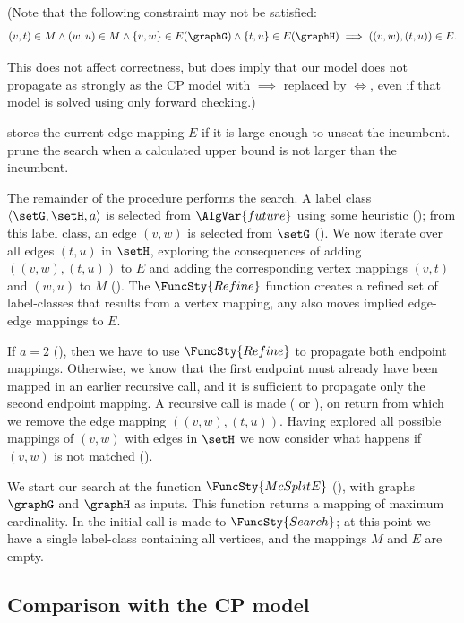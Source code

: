 (Note that the following constraint may not be satisfied:
\[
(v,t) \in M \wedge (w,u) \in M \wedge \{v,w\} \in E(\graphG) \wedge \{t,u\} \in E(\graphH) \implies ((v,w),(t,u)) \in E.
\]

This does not affect correctness, but does imply that our model does not propagate as strongly as
the CP model with $\implies$ replaced by $\Longleftrightarrow$,
even if that model is solved using only forward checking.)

 stores the current edge mapping $E$ if it is large enough
to unseat the incumbent.   prune the
search when a calculated upper bound is not larger than the incumbent.

The remainder of the procedure performs the search.  A label class $\langle
\setG, \setH, a \rangle$ is selected from $\AlgVar{future}$ using some
heuristic (); from this label class, an edge $(v,w)$ is
selected from $\setG$ (). We now iterate over all edges
$(t,u)$ in $\setH$, exploring the consequences of adding $((v,w),(t,u))$ to $E$
and adding the corresponding vertex mappings $(v,t)$ and $(w,u)$ to $M$
().  The $\FuncSty{Refine}$ function
creates a refined set of label-classes that results from a vertex mapping,
any also moves implied edge-edge mappings to $E$.

If $a=2$ (), then we have to use $\FuncSty{Refine}$ to propagate
both endpoint mappings.  Otherwise, we know that the first endpoint must already have
been mapped in an earlier recursive call, and it is sufficient to propagate only the second
endpoint mapping.  
A recursive call is made ( or ),
on return from which we remove the edge mapping $((v,w),(t,u))$.
Having explored all possible mappings of $(v,w)$ with edges in $\setH$ we now
consider what happens if $(v,w)$ is not matched
().

We start our search at the function $\FuncSty{McSplitE}$ (),
with graphs $\graphG$ and $\graphH$ as inputs.  This function returns a mapping of
maximum cardinality.  In  the initial call is made to
$\FuncSty{Search}$; at this point we have a single label-class containing all
vertices, and the mappings $M$ and $E$ are empty.

\subsection{Comparison with the CP model}


